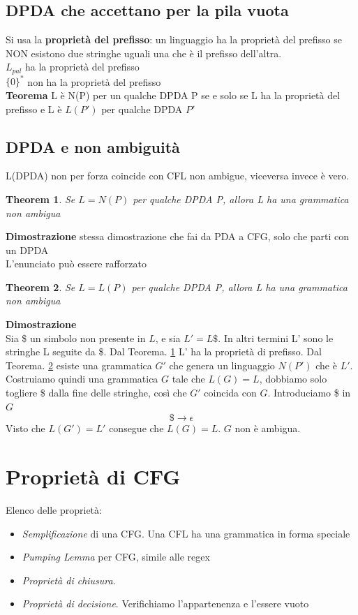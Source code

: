 \documentclass[12pt]{article}
\newtheorem{theorem}{Theorem}
\begin{document}
\subsection{DPDA che accettano per la pila vuota}
Si usa la \textbf{proprietà del prefisso}: un linguaggio ha la proprietà del prefisso se NON esistono due stringhe uguali una che è il prefisso dell'altra. 
\\ $L_{pal}$ ha la proprietà del prefisso
\\ $\{0\}^*$ non ha la proprietà del prefisso
\\ \textbf{Teorema} L è N(P) per un qualche DPDA P se e solo se L ha la proprietà del prefisso e L è $L(P')$ per qualche DPDA $P'$

\subsection{DPDA e non ambiguità}
L(DPDA) non per forza coincide con CFL non ambigue, viceversa invece è vero. 
\begin{theorem}
Se $L=N(P)$ per qualche DPDA P, allora L ha una grammatica non ambigua 
\label{dpda1}
\end{theorem}
\textbf{Dimostrazione} stessa dimostrazione che fai da PDA a CFG, solo che parti con un DPDA
\vspace{2mm}
\\ L'enunciato può essere rafforzato 
\begin{theorem}
 Se $L=L(P)$ per qualche DPDA P, allora L ha una grammatica non ambigua 
 \label{dpda2}
\end{theorem}
\textbf{Dimostrazione}
\\ Sia \$ un simbolo non presente in $L$, e sia $L'=L\$$. In altri termini L' sono le stringhe L seguite da \$.
Dal Teorema. \ref{dpda1} L' ha la proprietà di prefisso.
Dal Teorema. \ref{dpda2} esiste una grammatica $G'$ che genera un linguaggio $N(P')$ che è $L'$.
\\ Costruiamo quindi una grammatica $G$ tale che $L(G)=L$, dobbiamo solo togliere \$ dalla fine delle stringhe, così che $G'$ coincida con $G$. Introduciamo \$ in $G$
\[ \$ \rightarrow \epsilon \]
Visto che $L(G')=L'$ consegue che $L(G)=L$. $G$ non è ambigua.

\section{Proprietà di CFG}
Elenco delle proprietà: 
\begin{itemize}
  \item \emph{Semplificazione} di una CFG. Una CFL ha una grammatica in forma speciale
  \item \emph{Pumping Lemma} per CFG, simile alle regex
  \item \emph{Proprietà di chiusura}.
  \item \emph{Proprietà di decisione}. Verifichiamo l'appartenenza e l'essere vuoto 
\end{itemize}
\end{document}
